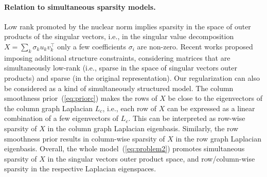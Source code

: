 \documentclass{article}
\begin{document}
\paragraph{Relation to simultaneous sparsity models.}
Low rank promoted by the nuclear norm implies sparsity in the space of outer products of the singular vectors, i.e., in the singular value decomposition $X  =  \sum_{k} \sigma_k u_k v_k^\top$ only a few coefficients $\sigma_i$ are non-zero. Recent works \cite{oymak2012simultaneously} proposed imposing additional structure constraints, considering matrices that are simultaneously low-rank (i.e., sparse in the space of singular vectors outer products) and sparse (in the original representation). Our regularization can also be considered as a kind of simultaneously structured model. The column smoothness prior~(\ref{eq:priorc}) makes the rows of $X$ be close to the eigenvectors of the column graph Laplacian $L_c$, i.e., each row of $X$ can be expressed as a linear combination of a few eigenvectors of $L_c$. This can be interpreted as row-wise sparsity of $X$ in the column graph Laplacian eigenbasis. 
Similarly, the row smoothness prior results in column-wise sparsity of $X$ in the row graph Laplacian eigenbasis. Overall, the whole model~(\ref{eq:problem2}) promotes simultaneous sparsity of $X$ in the singular vectors outer product space, and row/column-wise sparsity in the respective Laplacian eigenspaces. 

































\vspace{-0.05cm}
\end{document}
